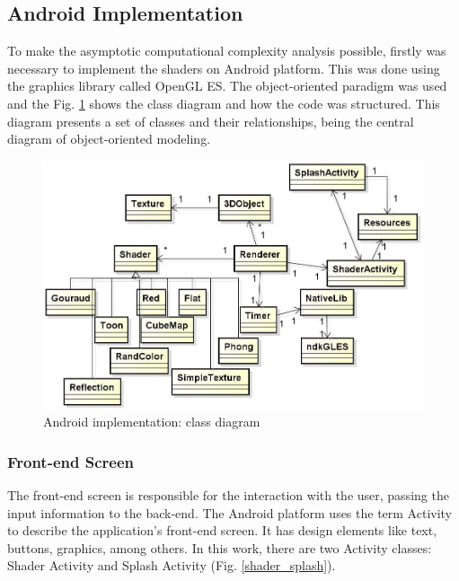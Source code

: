 \documentclass[10pt, conference, compsocconf]{IEEEtran}
\begin{document}
\subsection{Android Implementation}
\label{sec:android}

To make the asymptotic computational complexity analysis possible, firstly
was necessary to implement the shaders on Android platform. This was done
using the graphics library called OpenGL ES. The object-oriented paradigm was 
used and the Fig. \ref{class_diagram} shows the class diagram and how the code was structured. 
This diagram presents a set of classes and their relationships, being the central diagram
of object-oriented modeling.


	\begin{figure}[!t]
	\centering
	\includegraphics[keepaspectratio=true,scale=0.32]{class_diagram.jpg}
	\caption{Android implementation: class diagram}
	\label{class_diagram}
	\end{figure}

\subsubsection{Front-end Screen}

The front-end screen is responsible for the interaction with the user, 
passing the input information to the back-end. The Android platform
uses the term Activity to describe the application's front-end screen. It has 
design elements like text, buttons, graphics, among others. In this work,
there are two Activity classes: Shader Activity and Splash Activity (Fig. \ref{shader_splash}).
\end{document}
